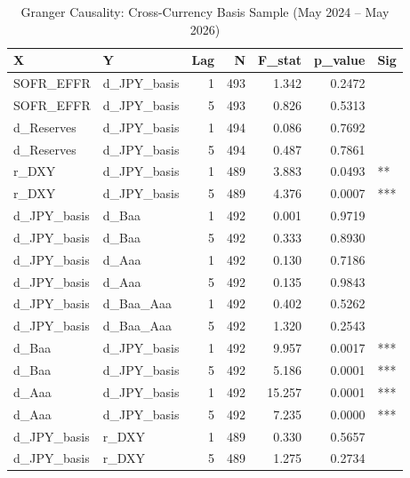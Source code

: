 \begin{table}[htbp]
\centering
\caption{Granger Causality: Cross-Currency Basis Sample (May 2024 -- May 2026)} 
\label{tab:granger_ccb}
\begin{tabular}{llrrrrl}
  \toprule
X & Y & Lag & N & F\_stat & p\_value & Sig \\ 
  \midrule
SOFR\_EFFR & d\_JPY\_basis & 1 & 493 & 1.342 & 0.2472 &     \\ 
  SOFR\_EFFR & d\_JPY\_basis & 5 & 493 & 0.826 & 0.5313 &     \\ 
  d\_Reserves & d\_JPY\_basis & 1 & 494 & 0.086 & 0.7692 &     \\ 
  d\_Reserves & d\_JPY\_basis & 5 & 494 & 0.487 & 0.7861 &     \\ 
  r\_DXY & d\_JPY\_basis & 1 & 489 & 3.883 & 0.0493 &  ** \\ 
  r\_DXY & d\_JPY\_basis & 5 & 489 & 4.376 & 0.0007 & *** \\ 
  d\_JPY\_basis & d\_Baa & 1 & 492 & 0.001 & 0.9719 &     \\ 
  d\_JPY\_basis & d\_Baa & 5 & 492 & 0.333 & 0.8930 &     \\ 
  d\_JPY\_basis & d\_Aaa & 1 & 492 & 0.130 & 0.7186 &     \\ 
  d\_JPY\_basis & d\_Aaa & 5 & 492 & 0.135 & 0.9843 &     \\ 
  d\_JPY\_basis & d\_Baa\_Aaa & 1 & 492 & 0.402 & 0.5262 &     \\ 
  d\_JPY\_basis & d\_Baa\_Aaa & 5 & 492 & 1.320 & 0.2543 &     \\ 
  d\_Baa & d\_JPY\_basis & 1 & 492 & 9.957 & 0.0017 & *** \\ 
  d\_Baa & d\_JPY\_basis & 5 & 492 & 5.186 & 0.0001 & *** \\ 
  d\_Aaa & d\_JPY\_basis & 1 & 492 & 15.257 & 0.0001 & *** \\ 
  d\_Aaa & d\_JPY\_basis & 5 & 492 & 7.235 & 0.0000 & *** \\ 
  d\_JPY\_basis & r\_DXY & 1 & 489 & 0.330 & 0.5657 &     \\
  d\_JPY\_basis & r\_DXY & 5 & 489 & 1.275 & 0.2734 &     \\ 
   \bottomrule
\end{tabular}
\end{table}
